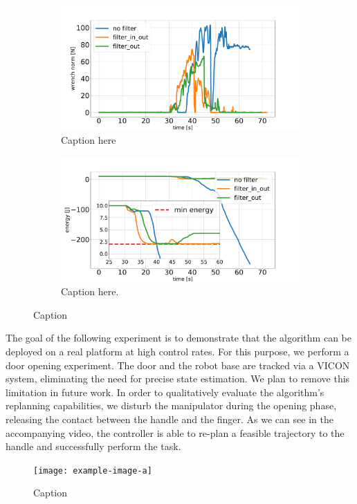 \begin{figure}[t]
\centering
\hspace*{-0.0cm} 
\begin{subfigure}{\columnwidth}
    \includegraphics[width=\linewidth]{figures/hardware_experiments/wrench_norm.pdf}
    \caption{Caption here}
\end{subfigure}
\hspace*{-0.0cm} 
\begin{subfigure}{\columnwidth}
    \includegraphics[width=\linewidth]{figures/hardware_experiments/tank_energy.pdf}
    \caption{Caption here.}
\end{subfigure}
    \caption{Caption}
    \label{fig:constraint_experiment}
\end{figure}

The goal of the following experiment is to demonstrate that the algorithm can be deployed on a real platform at high control rates. For this purpose, we perform a door opening experiment. The door and the robot base are tracked via a VICON system, eliminating the need for precise state estimation. We plan to remove this limitation in future work. In order to qualitatively evaluate the algorithm's replanning capabilities, we disturb the manipulator during the opening phase, releasing the contact between the handle and the finger. As we can see in the accompanying video, the controller is able to re-plan a feasible trajectory to the handle and successfully perform the task. 

\begin{figure}[t]
    \centering
    \texttt{[image: example-image-a]}
    \caption{Caption}
    \label{fig:tank_experiment}
\end{figure}